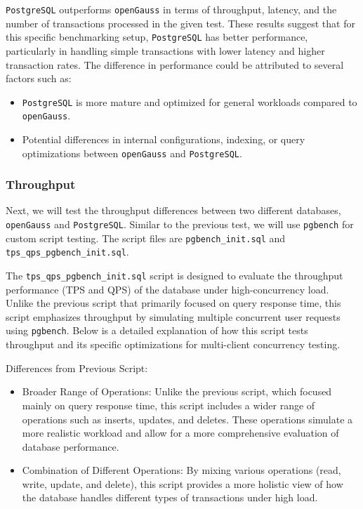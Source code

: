 \documentclass[12pt,a4paper,cs4size]{ctexart}
\begin{document}
\vspace{0.5cm}

\texttt{PostgreSQL} outperforms \texttt{openGauss} in terms of throughput, latency, and the number of transactions processed in the given test. These results suggest that for this specific benchmarking setup, \texttt{PostgreSQL} has better performance, particularly in handling simple transactions with lower latency and higher transaction rates. The difference in performance could be attributed to several factors such as:
\begin{itemize}
    \item \texttt{PostgreSQL} is more mature and optimized for general workloads compared to \texttt{openGauss}.
    \item Potential differences in internal configurations, indexing, or query optimizations between \texttt{openGauss} and \texttt{PostgreSQL}.
\end{itemize}


\subsubsection*{Throughput}

Next, we will test the throughput differences between two different databases, \texttt{openGauss} and \texttt{PostgreSQL}. Similar to the previous test, we will use \texttt{pgbench} for custom script testing. The script files are \texttt{pgbench\_init.sql}\cite{github2024} and \texttt{tps\_qps\_pgbench\_init.sql}\cite{github2024}.

The \texttt{tps\_qps\_pgbench\_init.sql}\cite{github2024} script is designed to evaluate the throughput performance (TPS and QPS) of the database under high-concurrency load. Unlike the previous script that primarily focused on query response time, this script emphasizes throughput by simulating multiple concurrent user requests using \texttt{pgbench}. Below is a detailed explanation of how this script tests throughput and its specific optimizations for multi-client concurrency testing.

Differences from Previous Script:
\begin{itemize}
    \item Broader Range of Operations: Unlike the previous script, which focused mainly on query response time, this script includes a wider range of operations such as inserts, updates, and deletes. These operations simulate a more realistic workload and allow for a more comprehensive evaluation of database performance.
    \item Combination of Different Operations: By mixing various operations (read, write, update, and delete), this script provides a more holistic view of how the database handles different types of transactions under high load.
\end{itemize}
\end{document}
